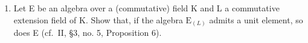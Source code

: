 \BourbakiExercisesSection

\begin{enumerate}
\def\labelenumi{\arabic{enumi}.}
\tightlist
\item
  Let E be an algebra over a (commutative) field K and L a commutative extension field of K. Show that, if the algebra \(\mathrm{E}_{(L)}\) admits a unit element, so does E (cf.~II, §3, no. 5, Proposition 6).
\end{enumerate}


